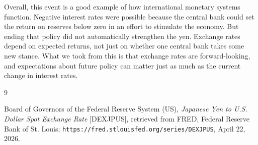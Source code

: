 \documentclass[12pt]{article}
\begin{document}
Overall, this event is a good example of how international monetary systems function. Negative interest rates were possible because the central bank could set the return on reserves below zero in an effort to stimulate the economy. But ending that policy did not automatically strengthen the yen. Exchange rates depend on expected returns, not just on whether one central bank takes some new stance. What we took from this is that exchange rates are forward-looking, and expectations about future policy can matter just as much as the current change in interest rates.

\begin{thebibliography}{9}

Board of Governors of the Federal Reserve System (US), \textit{Japanese Yen to U.S. Dollar Spot Exchange Rate} [DEXJPUS], retrieved from FRED, Federal Reserve Bank of St. Louis; \texttt{https://fred.stlouisfed.org/series/DEXJPUS}, April 22, 2026.

\end{thebibliography}
\end{document}
